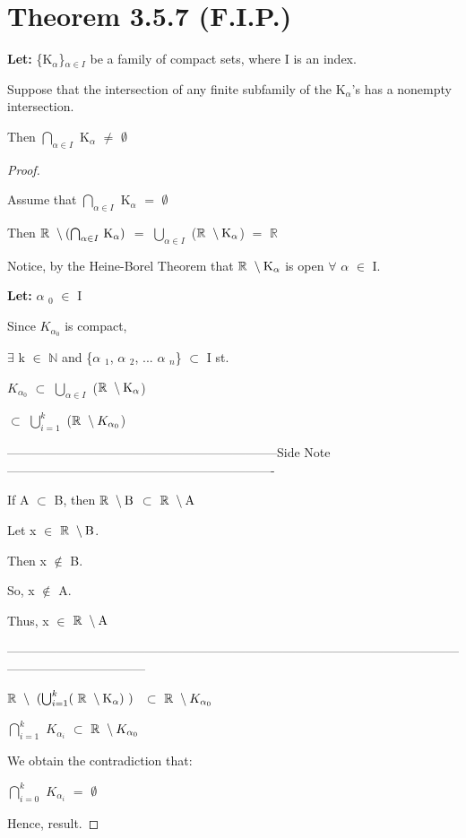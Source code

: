 \documentclass{article}
\newcommand{\mt}[1]{\ensuremath{#1}}
\newcommand\bsc[2][\DefaultOpt]{%
  \def\DefaultOpt{#2}%
  \section[#1]{#2}%
}
\newcommand{\bgpf}{\begin{proof} $ $\newline}
\newcommand{\lt}[1]{\textbf{Let: } #1}
\newcommand{\epf}{\end{proof}}
\newcommand{\dbs}[3]{\mt{#1_{#2_#3}}}
\newcommand{\sidenote}[1]{-----------------------------------------------------------------Side Note----------------------------------------------------------------
#1 \

---------------------------------------------------------------------------------------------------------------------------------------------}
\newcommand{\br}{\mt{\mathbb{R}} }       %
\newcommand{\bn}{\mt{\mathbb{N}} }       %
\newcommand{\fa}{\mt{\forall} }          %
\newcommand{\afa}{\mt{\alpha} }
\newcommand{\mem}{\mt{\in} }
\newcommand{\exs}{\mt{\exists} }
\newcommand{\es}{\mt{\emptyset} }        %
\newcommand{\sbs}{\mt{\subset} }         %
\newcommand{\eql}{\mt{=} }
\newcommand{\uw}[2]{#1\mt{_{#2}}}
\newcommand{\bnt}[2]{\mt{\textrm{#1}\setminus{\textrm{#2}}}}
\newcommand{\urng}[2]{\mt{\bigcup_{#1}^{#2}}}
\newcommand{\nrng}[2]{\mt{\bigcap_{#1}^{#2}}}
\begin{document}
\bsc{Theorem 3.5.7 (F.I.P.)}{

\lt{\uw{\{\uw{K}{\afa}\}}{\afa \mem I} be a family of compact sets, where I is an index.}

Suppose that the intersection of any finite subfamily of the \uw{K}{\afa}'s has a nonempty intersection.

Then \nrng{\afa \mem I}{} \uw{K}{\afa} $\neq$ \es

\bgpf

Assume that \nrng{\afa \mem I}{} \uw{K}{\afa} \eql \es

Then \bnt{\br}{(\nrng{\afa \mem I}{} \uw{K}{\afa})} \eql \urng{\afa \mem I}{} (\bnt{\br}{\uw{K}{\afa}}) \eql \br

Notice, by the Heine-Borel Theorem that \bnt{\br}{\uw{K}{\afa}} is open \fa \afa \mem I.

\lt{\uw{\afa}{0} \mem I}

Since \dbs{K}{\afa}{0} is compact,

\exs k \mem \bn and \{\uw{\afa}{1}, \uw{\afa}{2}, ... \uw{\afa}{n}\} \sbs I st.

\dbs{K}{\afa}{0} \sbs \urng{\afa \mem I}{} (\bnt{\br}{\uw{K}{\afa}})

\sbs \urng{i = 1}{k} (\bnt{\br}{\dbs{K}{\afa}{0}})

\sidenote{
If A \sbs B, then \bnt{\br}{B} \sbs \bnt{\br}{A}

Let x \mem \bnt{\br}{B}.

Then x $\not\in$ B.

So, x $\not\in$ A.

Thus, x \mem \bnt{\br}{A}
}

\bnt{\br}{
	(\urng{i=1}{k}(
		\bnt{\br}{\uw{K}{\afa}})
	)
} \sbs \bnt{\br}{\dbs{K}{\afa}{0}}

\nrng{i = 1}{k} \dbs{K}{\afa}{i} \sbs \bnt{\br}{\dbs{K}{\afa}{0}}

We obtain the contradiction that:

\nrng{i = 0}{k} \dbs{K}{\afa}{i} \eql \es

Hence, result.

\epf

}
\end{document}
